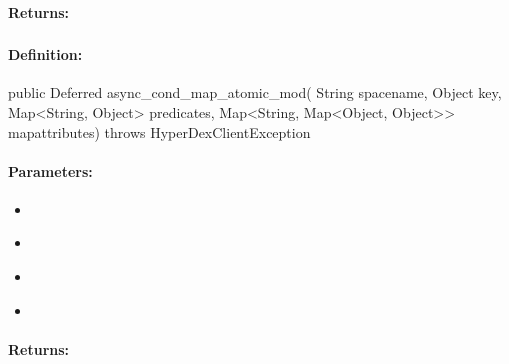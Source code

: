 \paragraph{Returns:}


\pagebreak
\subsubsection{}
\label{api:java:async_cond_map_atomic_mod}


\paragraph{Definition:}
\begin{javacode}
public Deferred async_cond_map_atomic_mod(
        String spacename,
        Object key,
        Map<String, Object> predicates,
        Map<String, Map<Object, Object>> mapattributes) throws HyperDexClientException
\end{javacode}

\paragraph{Parameters:}
\begin{itemize}[noitemsep]
\item {}\\

\item {}\\

\item {}\\

\item {}\\

\end{itemize}

\paragraph{Returns:}


